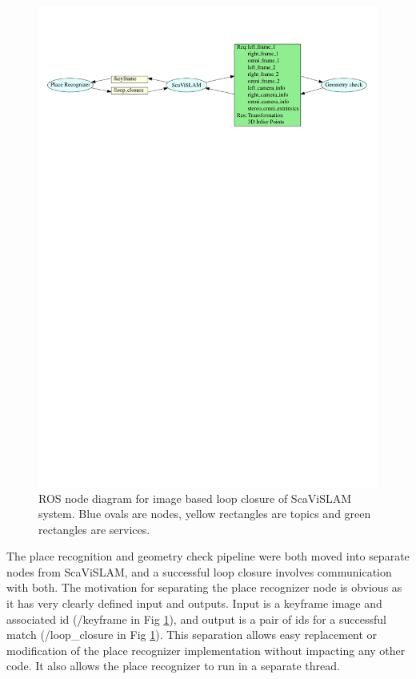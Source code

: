 \begin{figure}[h]
  \centering
    \includegraphics[width=1.0\textwidth]{chapters/images/loop_close_architecture}
  \caption{ROS node diagram for image based loop closure of ScaViSLAM system.  Blue ovals are nodes, yellow rectangles are topics and green rectangles are services.}
  \label{fig:loop_close_architecture}
\end{figure}

The place recognition and geometry check pipeline were both moved into separate nodes from ScaViSLAM, and a successful loop closure involves communication with both.  The motivation for separating the place recognizer node is obvious as it has very clearly defined input and outputs.  Input is a keyframe image and associated id (/keyframe in Fig \ref{fig:loop_close_architecture}), and output is a pair of ids for a successful match (/loop\_closure in Fig \ref{fig:loop_close_architecture}).  This separation allows easy replacement or modification of the place recognizer implementation without impacting any other code.  It also allows the place recognizer to run in a separate thread.

